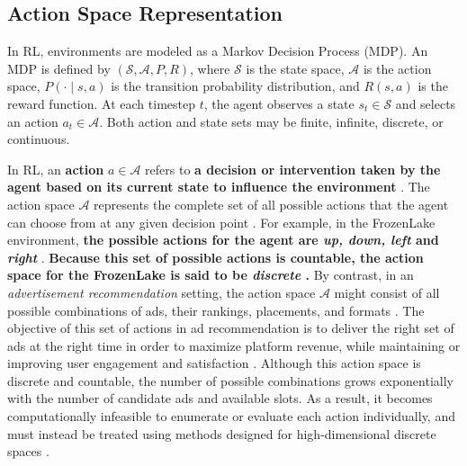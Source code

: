 \documentclass[final]{anthology-ch}         %
\begin{document}
\subsection{Action Space Representation}
\label{action_space_representation}

In RL, environments are modeled as a Markov Decision Process (MDP). An MDP is defined by $(\mathcal{S}, \mathcal{A}, P, R)$, where $\mathcal{S}$ is the state space, $\mathcal{A}$ is the action space, $P(\cdot\mid s,a)$ is the transition probability distribution, and $R(s,a)$ is the reward function. At each timestep $t$, the agent observes a state $s_t \in \mathcal{S}$ and selects an action $a_t \in \mathcal{A}$. Both action and state sets may be finite, infinite, discrete, or continuous.

In RL, an \textbf{action} $a \in \mathcal{A}$ refers to \textbf{a decision or intervention taken by the agent based on its current state to influence the environment} \cite{Sutton1998}. The action space $\mathcal{A}$  represents the complete set of all possible actions that the agent can choose from at any given decision point \cite{Sutton1998}. For example, in the  FrozenLake environment,\textbf{ the possible actions for the agent are \textit{up, down, left} and \textit{right}} \cite{frozenlake}. \textbf{Because this set of possible actions is countable, the action space for the FrozenLake is said to be \textit{discrete} \cite{frozenlake}.} By contrast, in an \emph{advertisement recommendation} setting, the action space $\mathcal{A}$ might consist of all possible combinations of ads, their rankings, placements, and formats \cite{ie2019slateq}. The objective of this set of actions in ad recommendation is to deliver the right set of ads at the right time in order to maximize platform revenue, while maintaining or improving user engagement and satisfaction \cite{zhao2020jointly}. Although this action space is discrete and countable, the number of possible combinations grows exponentially with the number of candidate ads and available slots. As a result, it becomes computationally infeasible to enumerate or evaluate each action individually, and must instead be treated using methods designed for high-dimensional discrete spaces \cite{ie2019recsim}.
\end{document}
